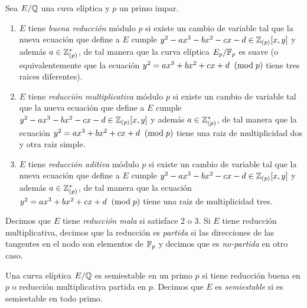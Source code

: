 \documentclass[../../tesis_maestria]{subfiles}
\begin{document}
\begin{defin}
  Sea $E/\mathbb{Q}$ una cuva el\'iptica y $p$ un primo impar.
  \begin{enumerate}
  \item $E$ tiene \emph{buena reducci\'on} m\'odulo $p$ si existe un cambio de variable tal que
    la nueva ecuaci\'on que define a $E$ cumple $y^2-ax^3-bx^2-cx-d\in\mathbb{Z}_{(p)}[x,y]$ y adem\'as
    $a\in\mathbb{Z}_{(p)}^*$, de tal manera que la curva el\'iptica $E_p/\mathbb{F}_p$ es suave (o equivalentemente
    que la ecuaci\'on $y^2=ax^3+bx^2+cx+d\;\;(\mathrm{mod}\; p)$ tiene tres raices diferentes).
  \item $E$ tiene \emph{reducci\'on multiplicativa} m\'odulo $p$ si existe un cambio de variable
    tal que la nueva ecuaci\'on que define a $E$ cumple $y^2-ax^3-bx^2-cx-d\in\mathbb{Z}_{(p)}[x,y]$ y
    adem\'as $a\in\mathbb{Z}_{(p)}^*$, de tal manera que la ecuaci\'on $y^2=ax^3+bx^2+cx+d\;\;(\mathrm{mod}\; p)$ tiene
    una raiz de multiplicidad dos y otra raiz simple.
  \item $E$ tiene \emph{reducci\'on aditiva} m\'odulo $p$ si existe un cambio de variable
    tal que la nueva ecuaci\'on que define a $E$ cumple $y^2-ax^3-bx^2-cx-d\in\mathbb{Z}_{(p)}[x,y]$ y
    adem\'as $a\in\mathbb{Z}_{(p)}^*$, de tal manera que la ecuaci\'on $y^2=ax^3+bx^2+cx+d\;\;(\mathrm{mod}\; p)$ tiene
    una raiz de multiplicidad tres.
  \end{enumerate}
  Decimos que $E$ tiene \emph{reducci\'on mala} si satisface 2 o 3. Si $E$ tiene reducci\'on
  multiplicativa, decimos que la reducci\'on es \emph{partida} si las direcciones de las tangentes
  en el nodo son elementos de $\mathbb{F}_p$ y decimos que es \emph{no-partida} en otro caso.
\end{defin}

\begin{defin}
  Una curva el\'iptica $E/\mathbb{Q}$ es semiestable en un primo $p$ si tiene reducci\'on buena en $p$
  o reducci\'on multiplicativa partida en $p$. Decimos que $E$ es \emph{semiestable} si es
  semiestable en todo primo.
\end{defin}
\end{document}
